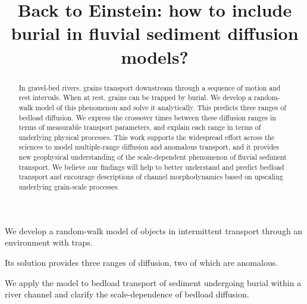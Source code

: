 \documentclass[]{agujournal2018}
\begin{document}
\title{Back to Einstein: how to include burial in fluvial sediment diffusion models?}


\begin{keypoints}
\item We develop a random-walk model of objects in intermittent transport through an environment with traps.
\item Its solution provides three ranges of diffusion, two of which are anomalous.
\item We apply the model to bedload transport of sediment undergoing burial within a river channel and clarify the scale-dependence of bedload diffusion.

\end{keypoints}

\begin{abstract}
	

In gravel-bed rivers, grains transport downstream through a sequence of motion and rest intervals. When at rest, grains can be trapped by burial.
We develop a random-walk model of this phenomenon and solve it analytically.
This predicts three ranges of bedload diffusion. We express the crossover times between these diffusion ranges in terms of measurable transport parameters, and explain each range in terms of underlying physical processes.
This work supports the widespread effort across the sciences to model multiple-range diffusion and anomalous transport, and it provides new geophysical understanding of the scale-dependent phenomenon of fluvial sediment transport. We believe our findings will help to better understand and predict bedload transport and encourage descriptions of channel morphodynamics based on upscaling underlying grain-scale processes.

\end{abstract}
\end{document}
